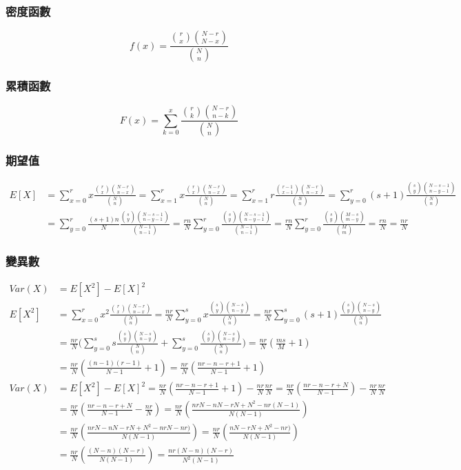 \documentclass{article}
\begin{document}
\bigskip
\subsubsection{密度函數}
\[ f(x)=\frac{\binom{r}{x}\binom{N-r}{N-x}}{\binom{N}{n}} \]

\subsubsection{累積函數}
\[ F(x)=\sum_{k=0}^x{\frac{\binom{r}{k}\binom{N-r}{n-k}}{\binom{N}{n}}} \]

\subsubsection{期望值}
\begin{align*}
E[X]
& = \sum_{x=0}^r{x\frac{\binom{r}{x}\binom{N-r}{n-x}}{\binom{N}{n}}}
  = \sum_{x=1}^r{x\frac{\binom{r}{x}\binom{N-r}{n-x}}{\binom{N}{n}}}
  = \sum_{x=1}^r{r\frac{\binom{r-1}{x-1}\binom{N-r}{n-x}}{\binom{N}{n}}}
  = \sum_{y=0}^r{(s+1)\frac{\binom{s}{y}\binom{N-s-1}{n-y-1}}{\binom{N}{n}}} \\
& = \sum_{y=0}^r{\frac{(s+1)n}{N}\frac{\binom{s}{y}\binom{N-s-1}{n-y-1}}{\binom{N-1}{n-1}}}
  = \frac{rn}{N}\sum_{y=0}^r{\frac{\binom{s}{y}\binom{N-s-1}{n-y-1}}{\binom{N-1}{n-1}}}
  = \frac{rn}{N}\sum_{y=0}^r{\frac{\binom{s}{y}\binom{M-s}{m-y}}{\binom{M}{m}}}
  = \frac{rn}{N}
  = \frac{nr}{N}
\end{align*}

\subsubsection{變異數}
\begin{align*}
Var(X)
& = E[X^2]-E[X]^2 \\
E[X^2] & = \sum_{x=0}^r{x^2\frac{\binom{r}{x}\binom{N-r}{n-x}}{\binom{N}{n}}}
  = \frac{nr}{N}\sum_{y=0}^s{x\frac{\binom{s}{y}\binom{N-s}{n-y}}{\binom{N}{n}}}
  = \frac{nr}{N}\sum_{y=0}^s{(s+1)\frac{\binom{s}{y}\binom{N-s}{n-y}}{\binom{N}{n}}} \\
& = \frac{nr}{N}\bigg(
    \sum_{y=0}^s{s\frac{\binom{s}{y}\binom{N-s}{n-y}}{\binom{N}{n}}}+
    \sum_{y=0}^s{\frac{\binom{s}{y}\binom{N-s}{n-y}}{\binom{N}{n}}}\bigg)
  = \frac{nr}{N}(\frac{ms}{M}+1) \\
& = \frac{nr}{N}(\frac{(n-1)(r-1)}{N-1}+1)
  = \frac{nr}{N}(\frac{nr-n-r+1}{N-1}+1) \\
Var(X) & = E[X^2]-E[X]^2
  = \frac{nr}{N}(\frac{nr-n-r+1}{N-1}+1)-\frac{nr}{N}\frac{nr}{N}
  = \frac{nr}{N}(\frac{nr-n-r+N}{N-1})-\frac{nr}{N}\frac{nr}{N} \\
& = \frac{nr}{N}(\frac{nr-n-r+N}{N-1}-\frac{nr}{N})
  = \frac{nr}{N}(\frac{nrN-nN-rN+N^2-nr(N-1)}{N(N-1)}) \\
& = \frac{nr}{N}(\frac{nrN-nN-rN+N^2-nrN-nr)}{N(N-1)})
  = \frac{nr}{N}(\frac{nN-rN+N^2-nr)}{N(N-1)}) \\
& = \frac{nr}{N}(\frac{(N-n)(N-r)}{N(N-1)})
  = \frac{nr(N-n)(N-r)}{N^2(N-1)}
\end{align*}
\end{document}
